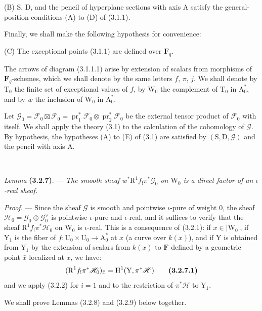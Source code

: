 \documentclass[11pt,leqno]{article}
\newcommand{\Page}[1]{\ifvmode\noindent\else\unskip\ \fi{\footnotesize\textcolor{gray}{[p.\,#1]}}\ \ignorespaces}
\begin{document}
(B) \(\mathrm{S}\), \(\mathrm{D}\), and the pencil of hyperplane sections with axis \(\mathrm{A}\) satisfy the general-position conditions (A) to (D) of (3.1.1).

Finally, we shall make the following hypothesis for convenience:

(C) The exceptional points (3.1.1) are defined over \(\mathbf{F}_q\).

The arrows of diagram (3.1.1.1) arise by extension of scalars from morphisms of \(\mathbf{F}_q\)-schemes, which we shall denote by the same letters \(f\), \(\pi\), \(j\). We shall denote by \(\mathrm{T}_0\) the finite set of exceptional values of \(f\), by \(\mathrm{W}_0\) the complement of \(\mathrm{T}_0\) in \(\mathrm{A}_0^*\), and by \(w\) the inclusion of \(\mathrm{W}_0\) in \(\mathrm{A}_0^*\).

Let \(\mathscr{G}_0=\mathscr{F}_0\boxtimes\mathscr{F}_0=\operatorname{pr}_1^*\mathscr{F}_0\otimes\operatorname{pr}_2^*\mathscr{F}_0\) be the external tensor product of \(\mathscr{F}_0\) with itself. We shall apply the theory (3.1) to the calculation of the cohomology of \(\mathscr{G}\). By hypothesis, the hypotheses (A) to (E) of (3.1) are satisfied by \((\mathrm{S},\mathrm{D},\mathscr{G})\) and the pencil with axis \(\mathrm{A}\).

\Page{202}

\textit{Lemma} \textbf{(3.2.7)}. — \textit{The smooth sheaf \(w^*\mathrm{R}^1f_!\pi^*\mathscr{G}_0\) on \(\mathrm{W}_0\) is a direct factor of an \(\iota\)-real sheaf.}

\textit{Proof.} — Since the sheaf \(\mathscr{G}\) is smooth and pointwise \(\iota\)-pure of weight \(0\), the sheaf \(\mathscr{H}_0=\mathscr{G}_0\oplus\mathscr{G}_0^\vee\) is pointwise \(\iota\)-pure and \(\iota\)-real, and it suffices to verify that the sheaf \(\mathrm{R}^1f_!\pi^*\mathscr{H}_0\) on \(\mathrm{W}_0\) is \(\iota\)-real. This is a consequence of (3.2.1): if \(x\in|\mathrm{W}_0|\), if \(\mathrm{Y}_1\) is the fiber of \(f:\mathrm{U}_0\times\mathrm{U}_0\to\mathrm{A}_0^*\) at \(x\) (a curve over \(k(x)\)), and if \(\mathrm{Y}\) is obtained from \(\mathrm{Y}_1\) by the extension of scalars from \(k(x)\) to \(\mathbf{F}\) defined by a geometric point \(\bar{x}\) localized at \(x\), we have:
\[
(\mathrm{R}^1f_!\pi^*\mathscr{H}_0)_{\bar{x}}
=\mathrm{H}^1(\mathrm{Y},\pi^*\mathscr{H})
\tag*{\textbf{(3.2.7.1)}}
\]
and we apply (3.2.2) for \(i=1\) and to the restriction of \(\pi^*\mathscr{H}\) to \(\mathrm{Y}_1\).

We shall prove Lemmas (3.2.8) and (3.2.9) below together.
\end{document}
